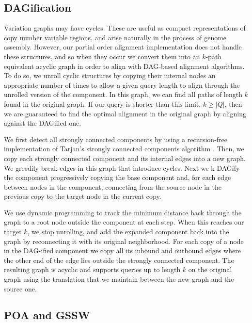 \subsection{DAGification}
\label{sec:DAGify}

Variation graphs may have cycles.
These are useful as compact representations of copy number variable regions, and arise naturally in the process of genome assembly.
However, our partial order alignment implementation does not handle these structures, and so when they occur we convert them into an $k$-path equivalent acyclic graph in order to align with DAG-based alignment algorithms.
To do so, we unroll cyclic structures by copying their internal nodes an appropriate number of times to allow a given query length to align through the unrolled version of the component.
In this graph, we can find all paths of length $k$ found in the original graph.
If our query is shorter than this limit, $k \geq |Q|$, then we are guaranteed to find the optimal alignment in the original graph by aligning against the DAGified one.

We first detect all strongly connected components by using a recursion-free implementation of Tarjan's strongly connected components algorithm \cite{tarjan1972depth}.
Then, we copy each strongly connected component and its internal edges into a new graph.
We greedily break edges in this graph that introduce cycles.
Next we k-DAGify the component progressively copying the base component and, for each edge between nodes in the component, connecting from the source node in the previous copy to the target node in the current copy.

We use dynamic programming to track the minimum distance back through the graph to a root node outside the component at each step.
When this reaches our target $k$, we stop unrolling, and add the expanded component back into the graph by reconnecting it with its original neighborhood.
For each copy of a node in the DAG-ified component we copy all its inbound and outbound edges where the other end of the edge lies outside the strongly connected component.
The resulting graph is acyclic and supports queries up to length $k$ on the original graph using the translation that we maintain between the new graph and the source one.


\subsection{POA and GSSW}

